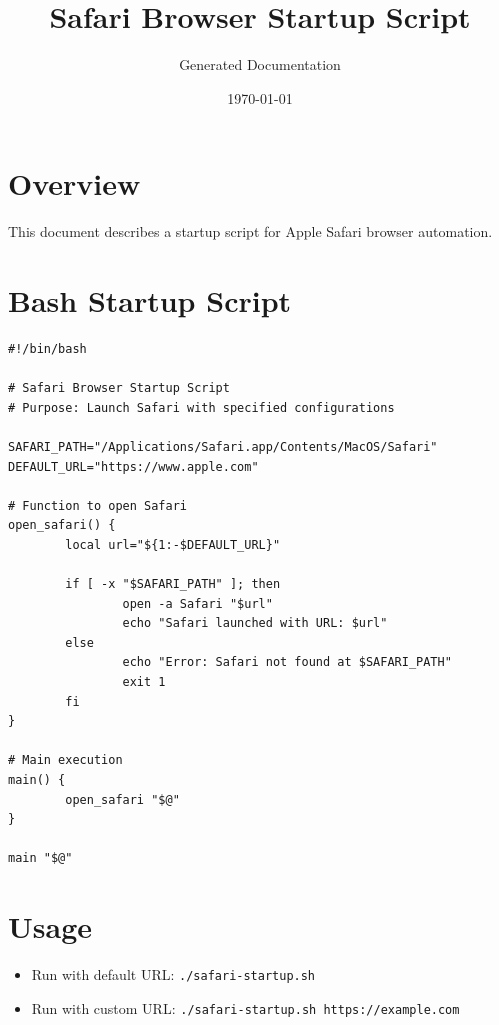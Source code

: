 \documentclass{article}
\title{Safari Browser Startup Script}
\author{Generated Documentation}
\date{\today}
\begin{document}
\maketitle

\section{Overview}
This document describes a startup script for Apple Safari browser automation.

\section{Bash Startup Script}

\begin{lstlisting}
#!/bin/bash

# Safari Browser Startup Script
# Purpose: Launch Safari with specified configurations

SAFARI_PATH="/Applications/Safari.app/Contents/MacOS/Safari"
DEFAULT_URL="https://www.apple.com"

# Function to open Safari
open_safari() {
        local url="${1:-$DEFAULT_URL}"
        
        if [ -x "$SAFARI_PATH" ]; then
                open -a Safari "$url"
                echo "Safari launched with URL: $url"
        else
                echo "Error: Safari not found at $SAFARI_PATH"
                exit 1
        fi
}

# Main execution
main() {
        open_safari "$@"
}

main "$@"
\end{lstlisting}

\section{Usage}
\begin{itemize}
        \item Run with default URL: \texttt{./safari-startup.sh}
        \item Run with custom URL: \texttt{./safari-startup.sh https://example.com}
\end{itemize}
\end{document}
